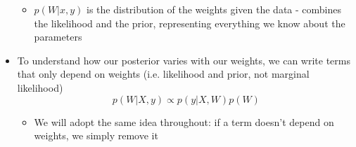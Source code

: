 \documentclass[12pt]{article}
\begin{document}
\begin{itemize}
\begin{itemize}
        \item $p(W|x, y)$ is the distribution of the weights given the data - combines the likelihood and the prior, representing everything we know about the parameters
    \end{itemize}
    \item To understand how our posterior varies with our weights, we can write terms that only depend on weights (i.e. likelihood and prior, not marginal likelihood)
\begin{equation}
    p(W|X, y) \propto p(y|X,W)p(W)
\end{equation}
     \begin{itemize}
         \item We will adopt the same idea throughout: if a term doesn't depend on weights, we simply remove it
     \end{itemize}
\end{itemize}
\end{document}
